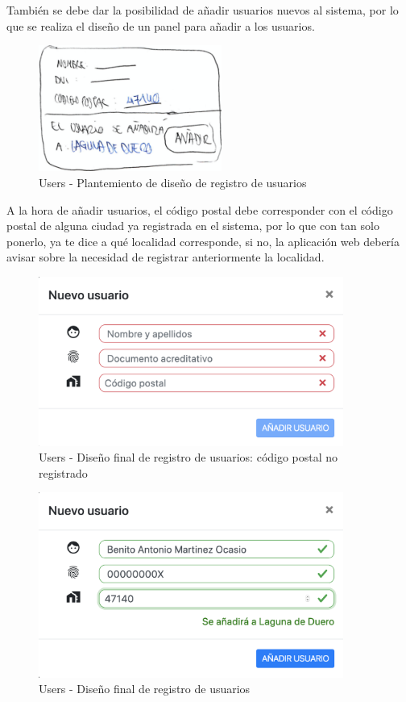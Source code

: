 \begin{enumerate}
    También se debe dar la posibilidad de añadir usuarios nuevos al sistema, por lo que se realiza el diseño de un panel para añadir a los usuarios.
    
    \begin{figure}[H]   
        \centering
        \includegraphics[width=6cm]{./img/web/users/users.add.pre.png}
        \caption{Users - Plantemiento de diseño de registro de usuarios}
        \label{fig:users.add.pre}
    \end{figure}
    
    A la hora de añadir usuarios, el código postal debe corresponder con el código postal de alguna ciudad ya registrada en el sistema, por lo que con tan solo ponerlo, ya te dice a qué localidad corresponde, si no, la aplicación web debería avisar sobre la necesidad de registrar anteriormente la localidad.
    
    \begin{figure}[H]   
        \centering
        \includegraphics[width=10cm]{./img/web2/users.add.png}
        \caption{Users - Diseño final de registro de usuarios: código postal no registrado}
        \label{fig:users.add.fail}
    \end{figure}
        
    \begin{figure}[H]   
        \centering
        \includegraphics[width=10cm]{./img/web2/users.add.complete.png}
        \caption{Users - Diseño final de registro de usuarios}
        \label{fig:users.add.post}
    \end{figure}
        

\end{enumerate}
